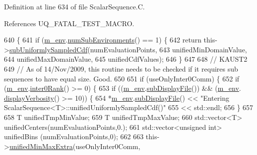 Definition at line 634 of file Scalar\-Sequence.\-C.



References U\-Q\-\_\-\-F\-A\-T\-A\-L\-\_\-\-T\-E\-S\-T\-\_\-\-M\-A\-C\-R\-O.


\begin{DoxyCode}
640 \{
641   \textcolor{keywordflow}{if} (\hyperlink{class_q_u_e_s_o_1_1_scalar_sequence_a71618cd6351b29361b437af68447a4c8}{m\_env}.\hyperlink{class_q_u_e_s_o_1_1_base_environment_ac0345f57e31ef7833e379ed972bd094d}{numSubEnvironments}() == 1) \{
642     \textcolor{keywordflow}{return} this->\hyperlink{class_q_u_e_s_o_1_1_scalar_sequence_a58405305f35483e422012f986eb06aa1}{subUniformlySampledCdf}(numEvaluationPoints,
643                                         unifiedMinDomainValue,
644                                         unifiedMaxDomainValue,
645                                         unifiedCdfValues);
646   \}
647 
648   \textcolor{comment}{// KAUST2}
649   \textcolor{comment}{// As of 14/Nov/2009, this routine needs to be checked if it requires sub sequences to have equal size.
       Good.}
650 
651   \textcolor{keywordflow}{if} (useOnlyInter0Comm) \{
652     \textcolor{keywordflow}{if} (\hyperlink{class_q_u_e_s_o_1_1_scalar_sequence_a71618cd6351b29361b437af68447a4c8}{m\_env}.\hyperlink{class_q_u_e_s_o_1_1_base_environment_ae106b5bb8a80b655b88b3a26b1e7c185}{inter0Rank}() >= 0) \{
653       \textcolor{keywordflow}{if} ((\hyperlink{class_q_u_e_s_o_1_1_scalar_sequence_a71618cd6351b29361b437af68447a4c8}{m\_env}.\hyperlink{class_q_u_e_s_o_1_1_base_environment_a8a0064746ae8dddfece4229b9ad374d6}{subDisplayFile}()) && (\hyperlink{class_q_u_e_s_o_1_1_scalar_sequence_a71618cd6351b29361b437af68447a4c8}{m\_env}.
      \hyperlink{class_q_u_e_s_o_1_1_base_environment_a1fe5f244fc0316a0ab3e37463f108b96}{displayVerbosity}() >= 10)) \{
654         *\hyperlink{class_q_u_e_s_o_1_1_scalar_sequence_a71618cd6351b29361b437af68447a4c8}{m\_env}.\hyperlink{class_q_u_e_s_o_1_1_base_environment_a8a0064746ae8dddfece4229b9ad374d6}{subDisplayFile}() << \textcolor{stringliteral}{"Entering
       ScalarSequence<T>::unifiedUniformlySampledCdf()"}
655                                 << std::endl;
656       \}
657 
658       T                         unifiedTmpMinValue;
659       T                         unifiedTmpMaxValue;
660       std::vector<T>            unifiedCenters(numEvaluationPoints,0.);
661       std::vector<unsigned int> unifiedBins   (numEvaluationPoints,0);
662 
663       this->\hyperlink{class_q_u_e_s_o_1_1_scalar_sequence_a6d63ff25462ff1366608bd37fe59165a}{unifiedMinMaxExtra}(useOnlyInter0Comm,

\end{DoxyCode}
